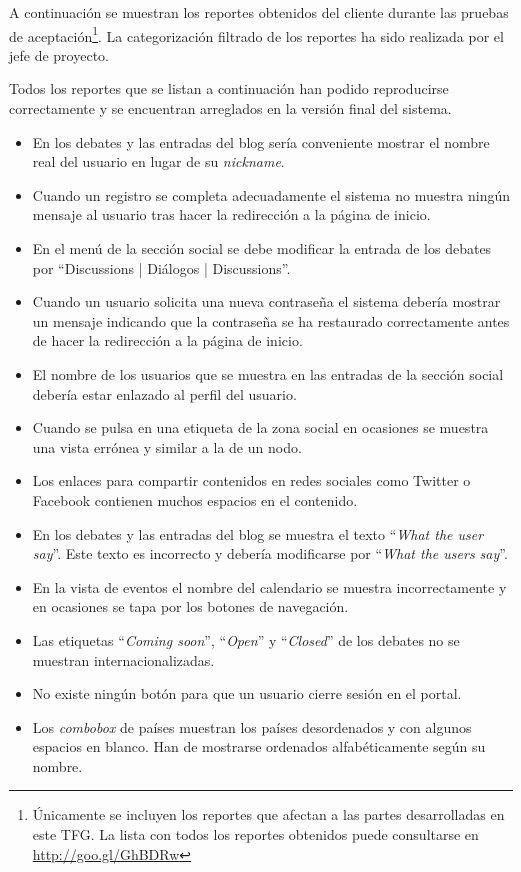 A continuación se muestran los reportes obtenidos del cliente durante las pruebas de aceptación\footnote{Únicamente se incluyen los reportes que afectan a las partes desarrolladas en este TFG.  La lista con todos los reportes obtenidos puede consultarse en \url{http://goo.gl/GhBDRw}}.  La categorización filtrado de los reportes ha sido realizada por el jefe de proyecto.

Todos los reportes que se listan a continuación han podido reproducirse correctamente y se encuentran arreglados en la versión final del sistema.
\begin{itemize}
	\item En los debates y las entradas del blog sería conveniente mostrar el nombre real del usuario en lugar de su \textit{nickname}.
	\item Cuando un registro se completa adecuadamente el sistema no muestra ningún mensaje al usuario tras hacer la redirección a la página de inicio.
	\item En el menú de la sección social se debe modificar la entrada de los debates por ``Discussions | Diálogos | Discussions''.
	\item Cuando un usuario solicita una nueva contraseña el sistema debería mostrar un mensaje indicando que la contraseña se ha restaurado correctamente antes de hacer la redirección a la página de inicio.
	\item El nombre de los usuarios que se muestra en las entradas de la sección social debería estar enlazado al perfil del usuario.
	\item Cuando se pulsa en una etiqueta de la zona social en ocasiones se muestra una vista errónea y similar a la de un nodo.
	\item Los enlaces para compartir contenidos en redes sociales como Twitter o Facebook contienen muchos espacios en el contenido.
	\item En los debates y las entradas del blog se muestra el texto ``\textit{What the user say}''.  Este texto es incorrecto y debería modificarse por ``\textit{What the users say}''.
	\item En la vista de eventos el nombre del calendario se muestra incorrectamente y en ocasiones se tapa por los botones de navegación.
	\item Las etiquetas ``\textit{Coming soon}'', ``\textit{Open}'' y ``\textit{Closed}'' de los debates no se muestran internacionalizadas.
	\item No existe ningún botón para que un usuario cierre sesión en el portal.
	\item Los \textit{combobox} de países muestran los países desordenados y con algunos espacios en blanco.  Han de mostrarse ordenados alfabéticamente según su nombre.

\end{itemize}

